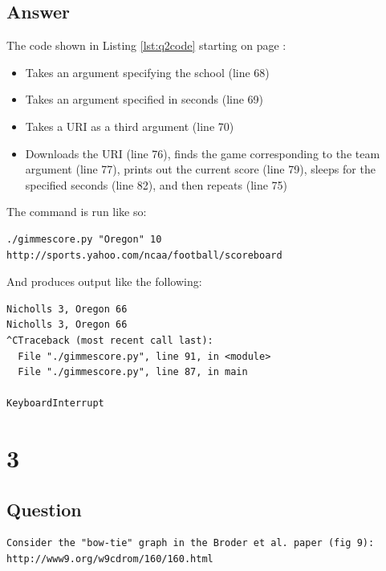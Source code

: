 \documentclass[letterpaper,11pt]{article}
\begin{document}
{\newpage
\subsection*{Answer}



\newpage
The code shown in Listing \ref{lst:q2code} starting on page \pageref{lst:q2code}:
\begin{itemize}
\item Takes an argument specifying the school (line 68)
\item Takes an argument specified in seconds (line 69)
\item Takes a URI as a third argument (line 70)
\item Downloads the URI (line 76), finds the game corresponding to the team argument (line 77), prints out the current score (line 79), sleeps for the specified seconds (line 82), and then repeats (line 75)
\end{itemize}

The command is run like so:
\begin{lstlisting}[frame=single]
./gimmescore.py "Oregon" 10 http://sports.yahoo.com/ncaa/football/scoreboard
\end{lstlisting}

And produces output like the following:
\begin{lstlisting}[frame=single]
Nicholls 3, Oregon 66
Nicholls 3, Oregon 66
^CTraceback (most recent call last):
  File "./gimmescore.py", line 91, in <module>
  File "./gimmescore.py", line 87, in main
    
KeyboardInterrupt
\end{lstlisting}


\newpage
\section*{3}

\subsection*{Question}

\begin{verbatim}
Consider the "bow-tie" graph in the Broder et al. paper (fig 9):
http://www9.org/w9cdrom/160/160.html


\end{verbatim}}
\end{document}
